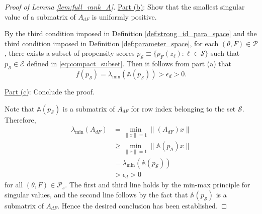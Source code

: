 \documentclass[11pt]{article}
\theoremstyle{definition}
\newcommand{\0}{\ensuremath{\mathbf{0}}}
\begin{document}
\begin{bibunit}
\begin{proof}[Proof of Lemma \ref{lem:full_rank_A}]
    \underline{Part (b)}: Show that the smallest singular value of a submatrix of $A_{dF}$ is uniformly positive. \par
    By the third condition imposed in Definition \ref{def:strong_id_para_space} and the third condition imposed in Definition \ref{def:parameter_space}, for each $(\theta,F)\in\mathcal{P}$, there exists a subset of propensity scores $p_{\mathcal{S}}\equiv \{p_F(z_\ell): \ell \in \mathcal{S} \}$ such that $p_{\mathcal{S}} \in \mathcal{E}$ defined in \eqref{eq:compact_subset}. Then it follows from part (a) that 
    \[
        f(p_\mathcal{S}) =  \lambda_{\min}(\mathbb{A}(p_{\mathcal{S}}))> \epsilon_d > 0.
    \]

    \underline{Part (c)}: Conclude the proof. \par
    Note that $\mathbb{A}(p_\mathcal{S})$ is a submatrix of $A_{dF}$ for row index belonging to the set $\mathcal{S}$. Therefore, 
    \begin{align*}
        \lambda_{\min}(A_{dF}) 
        &= \min_{\|x\| = 1} \|(A_{dF}) x\| \\
        &\geq \min_{\|x\| = 1} \|\mathbb{A}(p_{\mathcal{S}}) x\| \\
        &= \lambda_{\min}(\mathbb{A}(p_{\mathcal{S}})) \\
        &> \epsilon_d > 0
    \end{align*}
    for all $(\theta,F)\in\mathcal{P}_s$. The first and third line holds by the min-max principle for singular values, and the second line follows by the fact that $\mathbb{A}(p_{\mathcal{S}})$ is a submatrix of $A_{dF}$. Hence the desired conclusion has been established.
\end{proof}


\end{bibunit}
\end{document}
